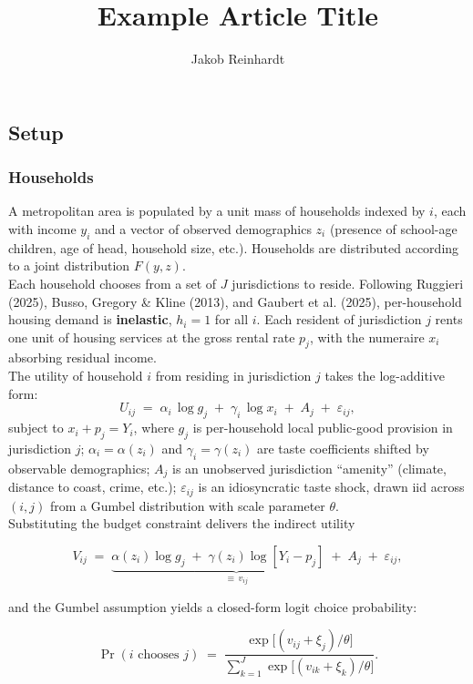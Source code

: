 \documentclass[fleqn,10pt]{olplainarticle}
\title{Example Article Title}
\author[1]{Jakob Reinhardt}
\affil[1]{Yale University}
\begin{document}
\setlength{\parindent}{0pt}
\flushbottom
\thispagestyle{empty}

\subsection*{Setup}
\subsubsection*{Households}
 
A metropolitan area is populated by a unit mass of households indexed by $i$, each with income $y_i$ and a vector of observed demographics $z_i$ (presence of school-age children, age of head, household size, etc.). Households are distributed according to a joint distribution $F(y, z)$.\\
 
Each household chooses from a set of $J$ jurisdictions to reside. Following Ruggieri (2025), Busso, Gregory \& Kline (2013), and Gaubert et al. (2025), per-household housing demand is \textbf{inelastic}, $h_i = 1$ for all $i$. Each resident of jurisdiction $j$ rents one unit of housing services at the gross rental rate $p_j$, with the numeraire $x_i$ absorbing residual income.\\
 
The utility of household $i$ from residing in jurisdiction $j$ takes the log-additive form:
$$U_{ij} \;=\; \alpha_i \, \log g_j \;+\; \gamma_i \, \log x_i \;+\; A_j \;+\; \varepsilon_{ij},$$
subject to $x_i + p_j = Y_i$, where $g_j$ is per-household local public-good provision in jurisdiction $j$; $\alpha_i = \alpha(z_i)$ and $\gamma_i = \gamma(z_i)$ are taste coefficients shifted by observable demographics; $A_j$ is an unobserved jurisdiction ``amenity'' (climate, distance to coast, crime, etc.); $\varepsilon_{ij}$ is an idiosyncratic taste shock, drawn iid across $(i, j)$ from a Gumbel distribution with scale parameter $\theta$.\\
 
Substituting the budget constraint delivers the indirect utility

$$V_{ij} \;=\; \underbrace{\alpha(z_i) \log g_j \;+\; \gamma(z_i) \log\!\left[Y_i - p_j\right] \;+\; A_j}_{\equiv \, v_{ij}} \;+\; \varepsilon_{ij},$$

and the Gumbel assumption yields a closed-form logit choice probability:
 
$$\Pr(\text{$i$ chooses $j$}) \;=\; \frac{\exp\!\big[(v_{ij} + \xi_j)/\theta\big]}{\sum_{k=1}^{J} \exp\!\big[(v_{ik} + \xi_k)/\theta\big]}.$$
 
\end{document}
